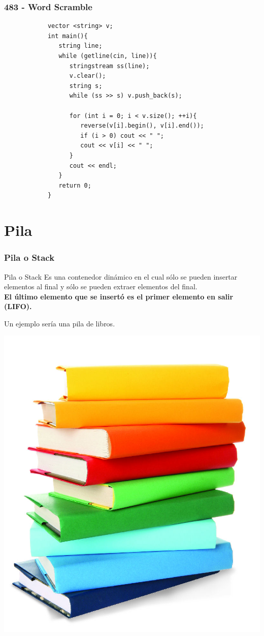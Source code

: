 \documentclass{beamer}
\begin{document}
	\begin{frame}[fragile]
		\frametitle{483 - Word Scramble}
		\begin{lstlisting}
			vector <string> v;
			int main(){
			   string line;
			   while (getline(cin, line)){
			      stringstream ss(line);
			      v.clear();
			      string s;
			      while (ss >> s) v.push_back(s);

			      for (int i = 0; i < v.size(); ++i){
			         reverse(v[i].begin(), v[i].end());
			         if (i > 0) cout << " ";
			         cout << v[i] << " ";
			      }
			      cout << endl;
			   }
			   return 0;
			}
		\end{lstlisting}
		
	\end{frame}


\section{Pila}
	\begin{frame}
		\frametitle{Pila o Stack}
		\begin{block}{Pila o Stack}
			Es una contenedor dinámico en el cual sólo se pueden insertar elementos al final y sólo se pueden extraer elementos del final.\\
			\textbf{El último elemento que se insertó es el primer elemento en salir (LIFO).}\\
		\end{block}		
		Un ejemplo sería una pila de libros.\\
		\begin{center}
			\includegraphics[height = 0.35\textheight]{stack_libros.jpg}
		\end{center}
	\end{frame}
	
\end{document}
